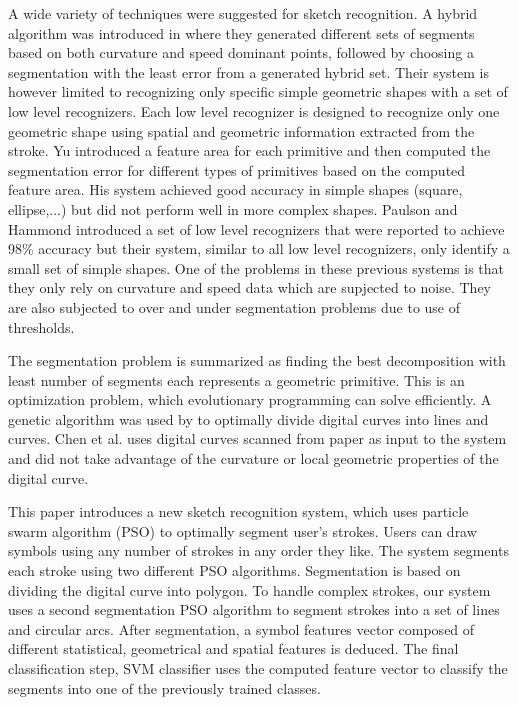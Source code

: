 \documentclass{article}
\begin{document}
A wide variety of techniques were suggested for sketch recognition.  A hybrid algorithm was introduced in \cite{earlyprocess} where they generated different sets of segments based on both curvature and speed dominant points, followed by choosing a segmentation with the least error from a generated hybrid set. Their system is however limited to recognizing only specific simple geometric shapes with a set of low level recognizers. Each low level recognizer is designed to recognize only one geometric shape using spatial and geometric information extracted from the stroke.  Yu \cite{meanshift10} introduced a feature area for each primitive and then computed the segmentation error for different types of primitives based on the computed feature area. His system achieved good accuracy in simple shapes (square, ellipse,...) but did not perform well in more complex shapes. Paulson and Hammond\cite{Paleosketch08} introduced a set of low level recognizers that were reported to achieve 98\%  accuracy but their system, similar to all low level recognizers, only identify a small set of simple shapes. One of the problems in these previous systems is that they only rely on curvature and speed data which are supjected to noise. They are also subjected to over and under segmentation problems due to use of thresholds. 

The segmentation problem is summarized as finding the best decomposition with least number of segments each represents a geometric primitive. This is an optimization problem, which evolutionary programming can solve efficiently. A genetic algorithm was used by \cite{CruveDivisionSwarm} to optimally divide digital curves into lines and curves. Chen et al.\cite{CruveDivisionSwarm} uses digital curves scanned from paper as input to the system and did not take advantage of the curvature or local geometric properties of the digital curve.

This paper introduces a new sketch recognition system, which uses particle swarm algorithm (PSO) to optimally segment user's strokes. Users can draw symbols using any number of strokes in any order they like. The system segments each stroke using two different PSO algorithms. Segmentation is based on dividing the digital curve into polygon\cite{PolygonApproximationPSO}. To handle complex strokes, our system uses a second segmentation PSO algorithm to segment strokes into a set of lines and circular arcs. After segmentation, a symbol features vector composed of different statistical, geometrical and spatial features is deduced. The final classification step, SVM classifier uses the computed feature vector to classify the segments into one of the previously trained classes. 
\end{document}
